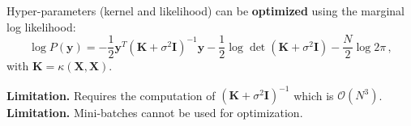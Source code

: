     \begin{frame}
        
        Hyper-parameters (kernel and likelihood) can be \textbf{optimized} using the marginal log likelihood:
        \[
            \log P(\mathbf y) = -\frac{1}{2}\mathbf y^T(\mathbf K + \sigma^2 \mathbf I)^{-1}\mathbf y - \frac{1}{2}\log \det (\mathbf K + \sigma^2 \mathbf I) - \frac{N}{2}\log 2\pi\,,
        \]
        with \(\mathbf K = \kappa(\mathbf X, \mathbf X)\).
        
        \vspace{1cm}
        
        \textbf{\alert{Limitation.}} Requires the computation of \((\mathbf K + \sigma^2 \mathbf I)^{-1}\) which is \(\mathcal O(N^3)\).\\
        \textbf{\alert{Limitation.}} Mini-batches cannot be used for optimization.
    \end{frame}

